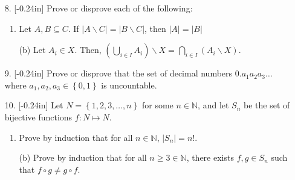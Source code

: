 \documentclass[letterpaper,12pt]{article}
\newcommand{\set}[1]{\left\{ #1 \right\}}
\theoremstyle{definition}
\begin{document}
\pagebreak
\begin{enumerate}
    \item[8.] \reversemarginpar{}[-0.24in] Prove or disprove each of the following: \begin{enumerate}
        \item Let $A,B \subseteq C$. If $|A\backslash C| = |B \backslash C|$, then $|A| = |B|$
    \end{enumerate}
\end{enumerate}
\pagebreak
\begin{enumerate}
    \item[] \begin{enumerate}
        \item[(b)] Let $A_i \in X$. Then, $(\bigcup_{i \in I} A_i) \backslash X = \bigcap_{i \in I} (A_i \backslash X)$.
    \end{enumerate}
\end{enumerate}
\pagebreak
\begin{enumerate}
    \item[9.] \reversemarginpar{}[-0.24in] Prove or disprove that the set of decimal numbers $0.a_1 a_2 a_3 \ldots$ where $a_1,a_2,a_3 \in \set{0,1}$ is uncountable.
\end{enumerate}
\pagebreak
\begin{enumerate}
    \item[10.] \reversemarginpar{}[-0.24in] 
Let $N= \set{1,2,3,\ldots,n}$ for some $n \in \mathbb{N}$, and let $S_n$ be the set of bijective functions $f: N \mapsto N$. \begin{enumerate}
    \item Prove by induction that for all $n \in \mathbb{N}$, $|S_n|=n!$.
\end{enumerate}
\end{enumerate}
\pagebreak
\begin{enumerate}
   \item[] \begin{enumerate}
       \item[(b)]  Prove by induction that for all $n \geq 3 \in \mathbb{N}$, there exists $f,g \in S_n$ such that $f \circ g \neq g \circ f$.
   \end{enumerate}
\end{enumerate}
\end{document}

